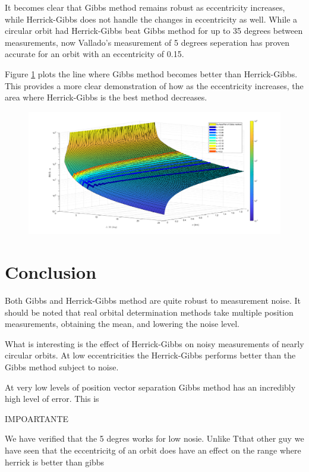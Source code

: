 \documentclass[12pt]{article}
\begin{document}
It becomes clear that Gibbs method remains robust as eccentricity increases, while Herrick-Gibbs does not handle the changes in eccentricity as well. While a circular orbit had Herrick-Gibbs beat Gibbs method for up to 35 degrees between measurements, now Vallado's measurement of 5 degrees seperation has proven accurate for an orbit with an eccentricity of 0.15.\par 


Figure \ref{fig:eccecomp} plots the line where Gibbs method becomes better than Herrick-Gibbs. This provides a more clear demonstration of how as the eccentricity increases, the area  where Herrick-Gibbs is the best method decreases. 
\begin{figure}[H]
	\centering
	\includegraphics[width=0.7\linewidth]{ecceComp_3}
	\caption{}
	\label{fig:eccecomp}
\end{figure}




	
	\section{Conclusion}
	Both Gibbs and Herrick-Gibbs method are quite robust to measurement noise. It should be noted that real orbital determination methods take multiple position measurements, obtaining the mean, and lowering the noise level. \par 
	
	What is interesting is the effect of Herrick-Gibbs on noisy measurements of nearly circular orbits. At low eccentricities the Herrick-Gibbs performs better than the Gibbs method subject to noise. 
	
	At very low levels of position vector separation Gibbs method has an incredibly high level of error. This is 
	
	IMPOARTANTE
	
	We have verified that the 5 degres works for low nosie.
	Unlike Tthat other guy we have seen that the eccentricitg of an orbit does have an effect on the range where herrick is better than gibbs
	
\end{document}
